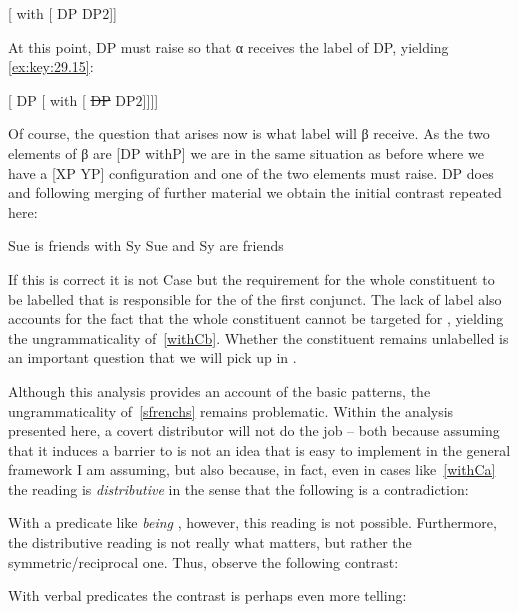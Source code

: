 \documentclass[output=paper]{langsci/langscibook}
\begin{document}
\ea\label{ex:key:29.14}
    {}[ with [ DP DP$2$]]
\z

At this point, DP must raise so that α receives the label of DP,
yielding \eqref{ex:key:29.15}:

\ea\label{ex:key:29.15}
    {}[ DP [ with [ \sout{DP} DP$2$]]]]
\z

Of course, the question that arises now is what label will β receive. As the
two elements of β are [DP withP] we are in the same situation as before
where we have a [XP YP] configuration and one of the two elements must raise.
DP does and following merging of further material we obtain the initial
contrast repeated here:

\ea\label{ex:key:29.16}
    \ea Sue is friends with Sy
    \ex Sue and Sy are friends
    \z
\z

If this is correct it is not Case but the requirement for the whole constituent
to be labelled that is responsible for the  of the first
conjunct. The lack of label also accounts for the fact that the whole
constituent cannot be targeted for , yielding the
ungrammaticality of~\eqref{withCb}. Whether the constituent remains unlabelled
is an important question that we will pick up in .

Although this analysis provides an account of the basic patterns, the
ungrammaticality of~\eqref{sfrenchs} remains problematic. Within the analysis
presented here, a covert distributor will not do the job -- both because
assuming that it induces a barrier to  is not an idea that is
easy to implement in the general framework I am assuming, but also because, in
fact, even in cases like~\eqref{withCa} the reading is \emph{distributive} in
the sense that the following is a contradiction:

\label{ex:key:29.17}
\z

With a predicate like \emph{being }, however, this reading is not
possible. Furthermore, the distributive reading is not really what matters, but
rather the symmetric/reciprocal one. Thus, observe the following contrast:

\ea\label{ex:key:29.18}
    \z
\z

With verbal predicates the contrast is perhaps even more telling:
\end{document}
